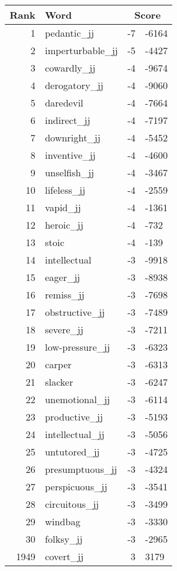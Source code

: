 \begin{longtable}[!htbp]{| rlr@{.}l |}
    \hline
    \textbf{Rank} & \textbf{Word} & \multicolumn{2}{c|}{\textbf{Score}} \\
    \hline
    \endhead
    1 & pedantic\_jj & -7 & -6164 \\
    2 & imperturbable\_jj & -5 & -4427 \\
    3 & cowardly\_jj & -4 & -9674 \\
    4 & derogatory\_jj & -4 & -9060 \\
    5 & daredevil & -4 & -7664 \\
    6 & indirect\_jj & -4 & -7197 \\
    7 & downright\_jj & -4 & -5452 \\
    8 & inventive\_jj & -4 & -4600 \\
    9 & unselfish\_jj & -4 & -3467 \\
    10 & lifeless\_jj & -4 & -2559 \\
    11 & vapid\_jj & -4 & -1361 \\
    12 & heroic\_jj & -4 & -732 \\
    13 & stoic & -4 & -139 \\
    14 & intellectual & -3 & -9918 \\
    15 & eager\_jj & -3 & -8938 \\
    16 & remiss\_jj & -3 & -7698 \\
    17 & obstructive\_jj & -3 & -7489 \\
    18 & severe\_jj & -3 & -7211 \\
    19 & low-pressure\_jj & -3 & -6323 \\
    20 & carper & -3 & -6313 \\
    21 & slacker & -3 & -6247 \\
    22 & unemotional\_jj & -3 & -6114 \\
    23 & productive\_jj & -3 & -5193 \\
    24 & intellectual\_jj & -3 & -5056 \\
    25 & untutored\_jj & -3 & -4725 \\
    26 & presumptuous\_jj & -3 & -4324 \\
    27 & perspicuous\_jj & -3 & -3541 \\
    28 & circuitous\_jj & -3 & -3499 \\
    29 & windbag & -3 & -3330 \\
    30 & folksy\_jj & -3 & -2965 \\
    1949 & covert\_jj & 3 & 3179 \\

\end{longtable}
